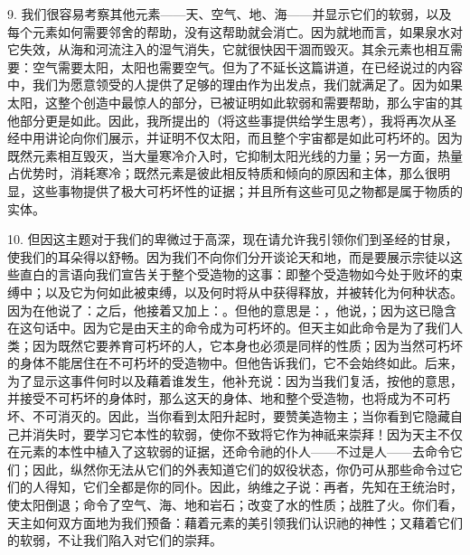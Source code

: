 9. 我们很容易考察其他元素——天、空气、地、海——并显示它们的软弱，以及每个元素如何需要邻舍的帮助，没有这帮助就会消亡。因为就地而言，如果泉水对它失效，从海和河流注入的湿气消失，它就很快因干涸而毁灭。其余元素也相互需要：空气需要太阳，太阳也需要空气。但为了不延长这篇讲道，在已经说过的内容中，我们为愿意领受的人提供了足够的理由作为出发点，我们就满足了。因为如果太阳，这整个创造中最惊人的部分，已被证明如此软弱和需要帮助，那么宇宙的其他部分更是如此。因此，我所提出的（将这些事提供给学生思考），我将再次从圣经中用讲论向你们展示，并证明不仅太阳，而且整个宇宙都是如此可朽坏的。因为既然元素相互毁灭，当大量寒冷介入时，它抑制太阳光线的力量；另一方面，热量占优势时，消耗寒冷；既然元素是彼此相反特质和倾向的原因和主体，那么很明显，这些事物提供了极大可朽坏性的证据；并且所有这些可见之物都是属于物质的实体。\par

10. 但因这主题对于我们的卑微过于高深，现在请允许我引领你们到圣经的甘泉，使我们的耳朵得以舒畅。因为我们不向你们分开谈论天和地，而是要展示宗徒以这些直白的言语向我们宣告关于整个受造物的这事：即整个受造物如今处于败坏的束缚中；以及它为何如此被束缚，以及何时将从中获得释放，并被转化为何种状态。因为在他说了：之后，他接着又加上：。但他的意思是：，他说，；因为这已隐含在这句话中。因为它是由天主的命令成为可朽坏的。但天主如此命令是为了我们人类；因为既然它要养育可朽坏的人，它本身也必须是同样的性质；因为当然可朽坏的身体不能居住在不可朽坏的受造物中。但他告诉我们，它不会始终如此。后来，为了显示这事件何时以及藉着谁发生，他补充说：因为当我们复活，按他的意思，并接受不可朽坏的身体时，那么这天的身体、地和整个受造物，也将成为不可朽坏、不可消灭的。因此，当你看到太阳升起时，要赞美造物主；当你看到它隐藏自己并消失时，要学习它本性的软弱，使你不致将它作为神祇来崇拜！因为天主不仅在元素的本性中植入了这软弱的证据，还命令祂的仆人——不过是人——去命令它们；因此，纵然你无法从它们的外表知道它们的奴役状态，你仍可从那些命令过它们的人得知，它们全都是你的同仆。因此，纳维之子说：再者，先知在王统治时，使太阳倒退；命令了空气、海、地和岩石；改变了水的性质；战胜了火。你们看，天主如何双方面地为我们预备：藉着元素的美引领我们认识祂的神性；又藉着它们的软弱，不让我们陷入对它们的崇拜。\par


